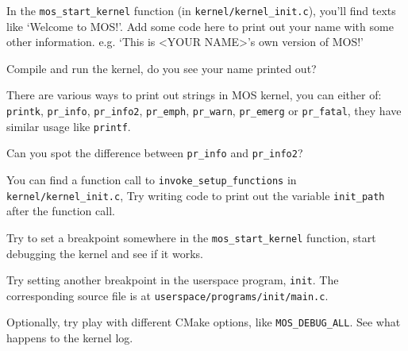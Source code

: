 \begin{exercise}
    \item In the \texttt{mos\_start\_kernel} function (in \texttt{kernel/kernel\_init.c}), you'll find
    texts like `Welcome to MOS!'. Add some code here to print out your name with some other information.
    e.g. `This is <YOUR NAME>'s own version of MOS!'

    Compile and run the kernel, do you see your name printed out?

    \begin{tip}
        \item There are various ways to print out strings in MOS kernel, you can either of:
        \texttt{printk}, \texttt{pr\_info}, \texttt{pr\_info2}, \texttt{pr\_emph}, \texttt{pr\_warn},
        \texttt{pr\_emerg} or \texttt{pr\_fatal}, they have similar usage like \texttt{printf}.
        \item Can you spot the difference between \texttt{pr\_info} and \texttt{pr\_info2}?
    \end{tip}

    \item You can find a function call to \texttt{invoke\_setup\_functions} in \texttt{kernel/kernel\_init.c},
    Try writing code to print out the variable \texttt{init\_path} after the function call.

    \item Try to set a breakpoint somewhere in the \texttt{mos\_start\_kernel} function, start debugging
    the kernel and see if it works.

    \item Try setting another breakpoint in the userspace program, \texttt{init}. The corresponding
    source file is at \texttt{userspace/programs/init/main.c}.

    \item Optionally, try play with different CMake options, like \texttt{MOS\_DEBUG\_ALL}. See what happens to the
    kernel log.
\end{exercise}
